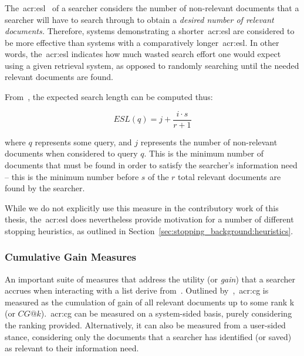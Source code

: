 \subsubsection{}\label{sec:ir_background:evaluation:system:esl}
The~\gls{acr:esl}~\citep{cooper1968expected_search_length} of a searcher considers the number of non-relevant documents that a searcher will have to search through to obtain a \emph{desired number of relevant documents.} Therefore, systems demonstrating a shorter~\gls{acr:esl} are considered to be more effective than systems with a comparatively longer~\gls{acr:esl}. In other words, the~\gls{acr:esl} indicates how much wasted search effort one would expect using a given retrieval system, as opposed to randomly searching until the needed relevant documents are found.

From~\cite{cooper1968expected_search_length}, the expected search length can be computed thus:

\begin{equation*}
ESL(q) = j + \frac{i \cdot s}{r + 1}
\end{equation*}

\noindent
where $q$ represents some query, and $j$ represents the number of non-relevant documents when considered to query $q$. This is the minimum number of documents that must be found in order to satisfy the searcher's information need -- this is the minimum number before $s$ of the $r$ total relevant documents are found by the searcher.

While we do not explicitly use this measure in the contributory work of this thesis, the~\gls{acr:esl} does nevertheless provide motivation for a number of different stopping heuristics, as outlined in Section~\ref{sec:stopping_background:heuristics}.

\subsubsection{Cumulative Gain Measures}
An important suite of measures that address the utility (or \emph{gain}) that a searcher accrues when interacting with a list derive from~. Outlined by~\cite{jarvelin2000cg, jarvelin2002cg},~\gls{acr:cg} is measured as the cumulation of gain of all relevant documents up to some rank k (or $CG@k$).~\gls{acr:cg} can be measured on a system-sided basis, purely considering the ranking provided. Alternatively, it can also be measured from a user-sided stance, considering only the documents that a searcher has identified (or saved) as relevant to their information need.

